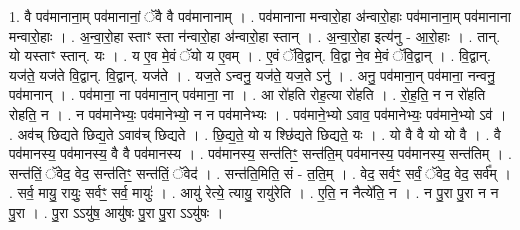 \documentclass[17pt]{extarticle}
\begin{document}
1. वै पव॑मानाना॒म् पव॑मानानां॒ ॅवै वै पव॑मानानाम् । . पव॑मानाना मन्वारो॒हा अ॑न्वारो॒हाः पव॑मानाना॒म् पव॑मानाना मन्वारो॒हाः । . अ॒न्वा॒रो॒हा स्ताꣳ स्ता न॑न्वारो॒हा अ॑न्वारो॒हा स्तान् । . अ॒न्वा॒रो॒हा इत्य॑नु - आ॒रो॒हाः । . तान्. यो यस्ताꣳ स्तान्. यः । . य ए॒व मे॒वं ॅयो य ए॒वम् । . ए॒वं ॅवि॒द्वान्. वि॒द्वा ने॒व मे॒वं ॅवि॒द्वान् । . वि॒द्वान्. यज॑ते॒ यज॑ते वि॒द्वान्. वि॒द्वान्. यज॑ते । . यज॒ते ऽन्वनु॒ यज॑ते॒ यज॒ते ऽनु॑ । . अनु॒ पव॑माना॒न् पव॑माना॒ नन्वनु॒ पव॑मानान् । . पव॑माना॒ ना पव॑माना॒न् पव॑माना॒ ना । . आ रो॑हति रोह॒त्या रो॑हति । . रो॒ह॒ति॒ न न रो॑हति रोहति॒ न । . न पव॑मानेभ्यः॒ पव॑मानेभ्यो॒ न न पव॑मानेभ्यः । . पव॑माने॒भ्यो ऽवाव॒ पव॑मानेभ्यः॒ पव॑माने॒भ्यो ऽव॑ । . अव॑च् छिद्यते छिद्य॒ते ऽवाव॑च् छिद्यते । . छि॒द्य॒ते॒ यो य श्छि॑द्यते छिद्यते॒ यः । . यो वै वै यो यो वै । . वै पव॑मानस्य॒ पव॑मानस्य॒ वै वै पव॑मानस्य । . पव॑मानस्य॒ सन्त॑तिꣳ॒॒ सन्त॑ति॒म् पव॑मानस्य॒ पव॑मानस्य॒ सन्त॑तिम् । . सन्त॑तिं॒ ॅवेद॒ वेद॒ सन्त॑तिꣳ॒॒ सन्त॑तिं॒ ॅवेद॑ । . सन्त॑ति॒मिति॒ सं - त॒ति॒म् । . वेद॒ सर्वꣳ॒॒ सर्वं॒ ॅवेद॒ वेद॒ सर्व᳚म् । . सर्व॒ मायु॒ रायुः॒ सर्वꣳ॒॒ सर्व॒ मायुः॑ । . आयु॑ रेत्ये॒ त्यायु॒ रायु॑रेति । . ए॒ति॒ न नैत्ये॑ति॒ न । . न पु॒रा पु॒रा न न पु॒रा । . पु॒रा ऽऽयु॑ष॒ आयु॑षः पु॒रा पु॒रा ऽऽयु॑षः । \newline
\end{document}
